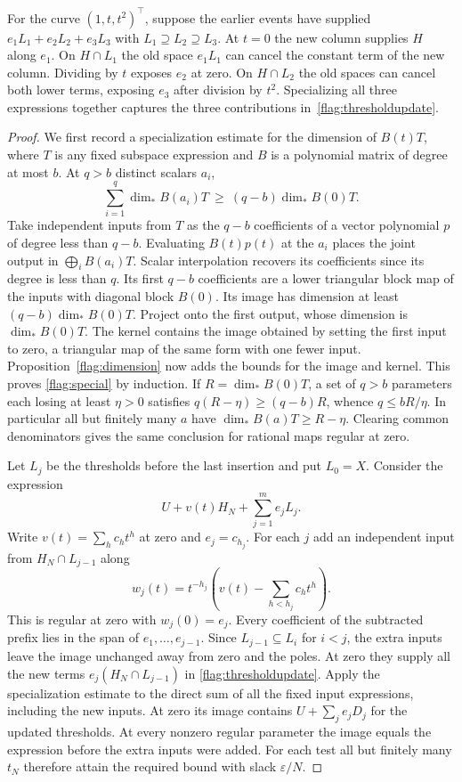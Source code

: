 For the curve $(1,t,t^2)^\top$, suppose the earlier events have
supplied $e_1L_1+e_2L_2+e_3L_3$ with $L_1\supseteq L_2\supseteq L_3$.
At $t=0$ the new column supplies $H$ along $e_1$. On $H\cap L_1$
the old space $e_1L_1$ can cancel the constant term of the new column.
Dividing by $t$ exposes $e_2$ at zero. On $H\cap L_2$ the old spaces
can cancel both lower terms, exposing $e_3$ after division by $t^2$.
Specializing all three expressions together captures the three
contributions in~\eqref{flag:thresholdupdate}.

\begin{proof}
We first record a specialization estimate for the dimension of $B(t)T$,
where $T$ is any fixed subspace expression and $B$ is a polynomial
matrix of degree at most $b$. At $q>b$ distinct scalars $a_i$,
\begin{equation}\label{flag:special}
 \sum_{i=1}^q\dim_* B(a_i)T\ \ge\ (q-b)\dim_* B(0)T .
\end{equation}
Take independent inputs from $T$ as the $q-b$ coefficients of a vector
polynomial $p$ of degree less than $q-b$. Evaluating $B(t)p(t)$ at the
$a_i$ places the joint output in $\bigoplus_i B(a_i)T$.
Scalar interpolation recovers its coefficients since its degree is less
than $q$. Its first $q-b$ coefficients are a lower triangular block map
of the inputs with diagonal block $B(0)$. Its image has dimension at
least $(q-b)\dim_*B(0)T$. Project onto the first output, whose
dimension is $\dim_*B(0)T$. The kernel contains the image obtained
by setting the first input to zero, a triangular map of the same
form with one fewer input. Proposition~\ref{flag:dimension} now
adds the bounds for the image and kernel. This proves
\eqref{flag:special} by induction. If $R=\dim_* B(0)T$, a set of
$q>b$ parameters each losing at least $\eta>0$ satisfies
$q(R-\eta)\ge(q-b)R$, whence $q\le bR/\eta$. In particular all
but finitely many $a$ have $\dim_* B(a)T\ge R-\eta$.
Clearing common denominators gives the same conclusion for rational
maps regular at zero.

Let $L_j$ be the thresholds before the last insertion and put $L_0=X$.
Consider the expression
\[
 U+v(t)H_N+\sum_{j=1}^m e_j L_j .
\]
Write $v(t)=\sum_h c_h t^h$ at zero and $e_j=c_{h_j}$. For each $j$
add an independent input from $H_N\cap L_{j-1}$ along
\[
 w_j(t)=t^{-h_j}\!\left(v(t)-\sum_{h<h_j}c_h t^h\right).
\]
This is regular at zero with $w_j(0)=e_j$. Every coefficient of the
subtracted prefix lies in the span of $e_1,\ldots,e_{j-1}$. Since
$L_{j-1}\subseteq L_i$ for $i<j$, the extra inputs leave the image
unchanged away from zero and the poles. At zero they supply all the
new terms $e_j(H_N\cap L_{j-1})$ in \eqref{flag:thresholdupdate}.
Apply the specialization estimate to the direct sum of all the fixed
input expressions, including the new inputs. At zero its image contains
$U+\sum_j e_jD_j$ for the updated thresholds. At every nonzero regular
parameter the image equals the expression before the extra inputs were
added. For each test all but finitely many $t_N$ therefore attain the
required bound with slack $\varepsilon/N$.


\end{proof}
